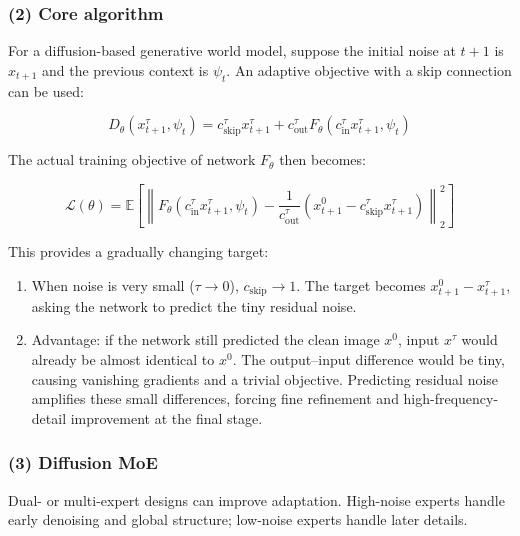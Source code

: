 \hypertarget{core-algorithm}{%
\subsubsection{(2) Core algorithm}\label{core-algorithm}}

For a diffusion-based generative world model, suppose the initial noise at \(t+1\) is \(x_{t+1}\) and the previous context is \(\psi_t\). An adaptive objective with a skip connection can be used:

\[
D_\theta(x_{t+1}^{\tau},\psi_t)
=c_{\mathrm{skip}}^\tau x_{t+1}^{\tau}
+c_{\mathrm{out}}^\tau F_\theta(c_{\mathrm{in}}^\tau x_{t+1}^{\tau},\psi_t)
\]

The actual training objective of network \(F_\theta\) then becomes:

\[
\mathcal{L}(\theta)=
\mathbb{E}\left[
\left\|
F_\theta(c_{\mathrm{in}}^\tau x_{t+1}^{\tau},\psi_t) -
\frac{1}{c_{\mathrm{out}}^\tau}
\left(x_{t+1}^{0}-c_{\mathrm{skip}}^\tau x_{t+1}^{\tau}\right)
\right\|_2^2
\right]
\]

This provides a gradually changing target:

\begin{enumerate}
\def\labelenumi{\arabic{enumi}.}
\tightlist
\item
  When noise is very small (\(\tau\to 0\)), \(c_{\mathrm{skip}}\to 1\). The target becomes \(x_{t+1}^0-x_{t+1}^{\tau}\), asking the network to predict the tiny residual noise.
\item
  Advantage: if the network still predicted the clean image \(x^0\), input \(x^\tau\) would already be almost identical to \(x^0\). The output--input difference would be tiny, causing vanishing gradients and a trivial objective. Predicting residual noise amplifies these small differences, forcing fine refinement and high-frequency-detail improvement at the final stage.
\end{enumerate}

\hypertarget{diffusion-moe}{%
\subsubsection{(3) Diffusion MoE}\label{diffusion-moe}}

Dual- or multi-expert designs can improve adaptation. High-noise experts handle early denoising and global structure; low-noise experts handle later details.

